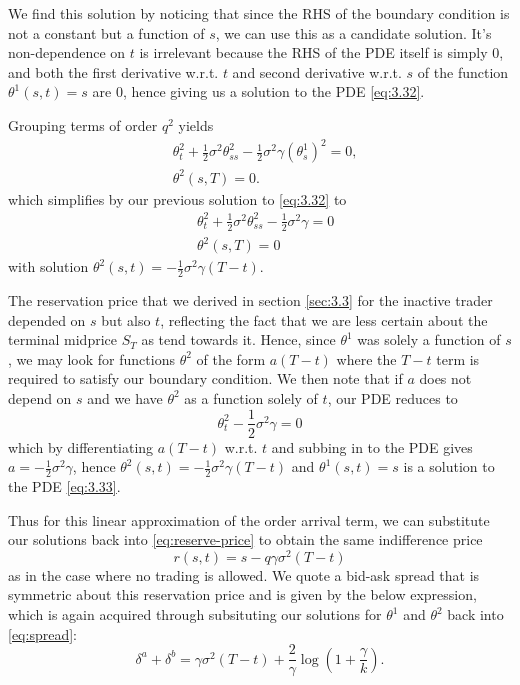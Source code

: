 We find this solution by noticing
that since the RHS of the boundary condition is not a constant but a function of $s$,
we can use this as a candidate solution. It's non-dependence on $t$ is irrelevant 
because the RHS of the PDE itself is simply $0$, and both the first derivative w.r.t.
$t$ and second derivative w.r.t. $s$ of the function $\theta^1(s,t)=s$ are $0$, hence 
giving us a solution to the PDE \eqref{eq:3.32}. 

Grouping terms of order $q^2$ yields
\begin{equation}\label{eq:3.33}
    \begin{aligned}
        &\theta^2_t+\frac{1}{2}\sigma^2\theta^2_{ss}-\frac{1}{2}\sigma^2\gamma(\theta^1_s)^2=0,\\
        &\theta^2(s,T)=0.
    \end{aligned}
\end{equation}
which simplifies by our previous solution to \eqref{eq:3.32} to
\begin{equation*}
    \begin{aligned}
        &\theta^2_t+\frac{1}{2}\sigma^2\theta^2_{ss}-\frac{1}{2}\sigma^2\gamma=0\\
        &\theta^2(s,T)=0
    \end{aligned}
\end{equation*}
with solution $\theta^2(s,t)=-\frac{1}{2}\sigma^2\gamma(T-t)$.

The reservation price that we derived in section \ref{sec:3.3} for the inactive trader 
depended on $s$ but also $t$, reflecting the fact that we are less certain about the 
terminal midprice $S_T$ as tend towards it. Hence, since $\theta^1$ was solely a function
of $s$, we may look for functions $\theta^2$ of the form $a(T-t)$ where the $T-t$ 
term is required to satisfy our boundary condition. We then note that if $a$ does not 
depend on $s$ and we have $\theta^2$ as a function solely of $t$, our PDE reduces to
\begin{equation*}
    \theta^2_t-\frac{1}{2}\sigma^2\gamma=0
\end{equation*}
which by differentiating $a(T-t)$ w.r.t. $t$ and subbing in to the PDE gives 
$a=-\frac{1}{2}\sigma^2\gamma$, hence $\theta^2(s,t)=-\frac{1}{2}\sigma^2\gamma(T-t)$
and $\theta^1(s,t)=s$ is a solution to the PDE \eqref{eq:3.33}.

Thus for this linear approximation of the order arrival term, we can substitute our
solutions back into \eqref{eq:reserve-price} to obtain the same indifference price
\begin{equation}\label{eq:3.34}
    r(s,t)=s-q\gamma\sigma^2(T-t)
\end{equation}
as in the case where no trading is allowed. We quote a bid-ask spread that is symmetric
about this reservation price and is given by the below expression, which is again acquired
through subsituting our solutions for $\theta^1$ and $\theta^2$ back into \eqref{eq:spread}:
\begin{equation}\label{eq:3.35}
    \delta^a+\delta^b=\gamma\sigma^2(T-t)+\frac{2}{\gamma}\log\left(1+\frac{\gamma}{k}\right).
\end{equation}


